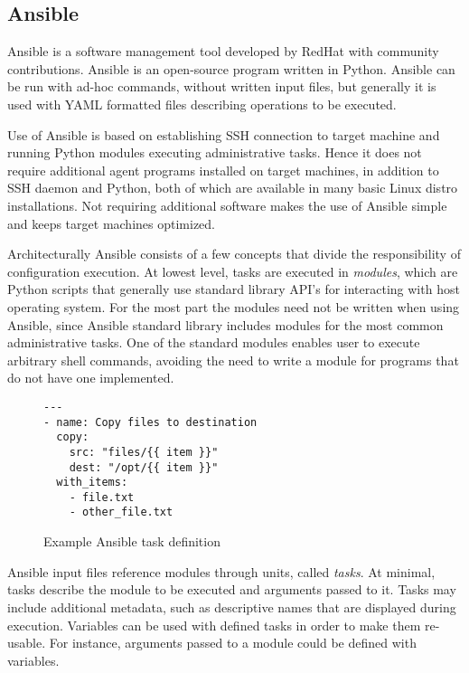 \subsection{Ansible}

Ansible \cite{ansible} is a software management tool developed by RedHat with
community contributions. Ansible is an open-source program written in Python.
Ansible can be run with ad-hoc commands, without written input files, but
generally it is used with YAML formatted files describing operations to be
executed.

Use of Ansible is based on establishing SSH connection to target machine and
running Python modules executing administrative tasks. Hence it does not
require additional  agent programs installed on target machines, in addition to
SSH daemon and Python, both of which are available in many basic Linux distro
installations. Not requiring additional software makes the use of Ansible
simple and keeps target machines optimized.

Architecturally Ansible consists of a few concepts that divide the
responsibility of configuration execution. At lowest level, tasks are executed
in \textit{modules}, which are Python scripts that generally use standard
library API's for interacting with host operating system. For the most part the
modules need not be written when using Ansible, since Ansible standard library
includes modules for the most common administrative tasks. One of the standard
modules enables user to execute arbitrary shell commands, avoiding the need to
write a module for programs that do not have one implemented.

\begin{figure}[t]
\centering
\begin{verbatim}
---
- name: Copy files to destination
  copy:
    src: "files/{{ item }}"
    dest: "/opt/{{ item }}"
  with_items:
    - file.txt
    - other_file.txt
\end{verbatim}

\caption{Example Ansible task definition}
\label{fig:ansible-task}
\end{figure}

Ansible input files reference modules through units, called \textit{tasks}.
At minimal, tasks describe the module to be executed and arguments passed to
it. Tasks may include additional metadata, such as descriptive names that are
displayed during execution. Variables can be used with defined tasks in order
to make them re-usable. For instance, arguments passed to a module could be
defined with variables.

